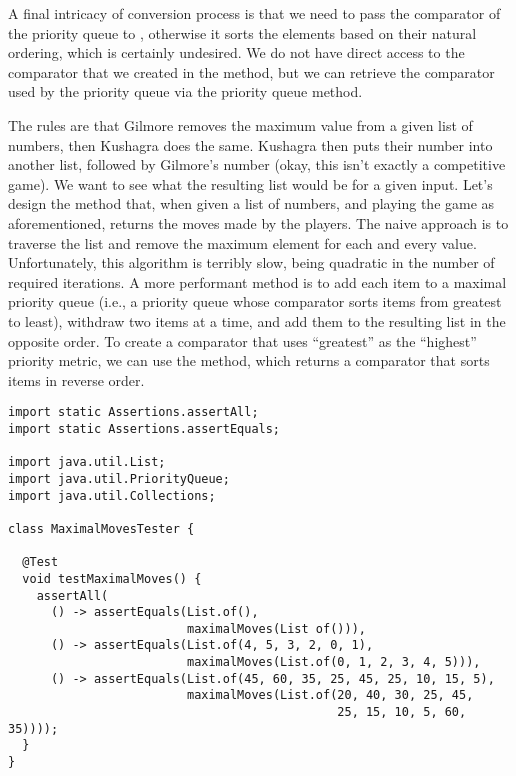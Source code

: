 A final intricacy of conversion process is that we need to pass the comparator of the priority queue to , otherwise it sorts the elements based on their natural ordering, which is certainly undesired. 
We do not have direct access to the comparator that we created in the  method, but we can retrieve the comparator used by the priority queue via the priority queue  method. 

The rules are that Gilmore removes the maximum value from a given list of numbers, then Kushagra does the same.
Kushagra then puts their number into another list, followed by Gilmore's number (okay, this isn't exactly a competitive game).
We want to see what the resulting list would be for a given input.
Let's design the  method that, when given a list of numbers, and playing the game as aforementioned, returns the moves made by the players.
The naive approach is to traverse the list and remove the maximum element for each and every value. 
Unfortunately, this algorithm is terribly slow, being quadratic in the number of required iterations.
A more performant method is to add each item to a maximal priority queue (i.e., a priority queue whose comparator sorts items from greatest to least), withdraw two items at a time, and add them to the resulting list in the opposite order.
To create a comparator that uses ``greatest'' as the ``highest'' priority metric, we can use the  method, which returns a comparator that sorts items in reverse order.

\begin{lstlisting}[language=MyJava]
import static Assertions.assertAll;
import static Assertions.assertEquals;

import java.util.List;
import java.util.PriorityQueue;
import java.util.Collections;

class MaximalMovesTester {

  @Test
  void testMaximalMoves() {
    assertAll(
      () -> assertEquals(List.of(), 
                         maximalMoves(List of())),
      () -> assertEquals(List.of(4, 5, 3, 2, 0, 1), 
                         maximalMoves(List.of(0, 1, 2, 3, 4, 5))),
      () -> assertEquals(List.of(45, 60, 35, 25, 45, 25, 10, 15, 5), 
                         maximalMoves(List.of(20, 40, 30, 25, 45, 
                                              25, 15, 10, 5, 60, 35))));
  }
}
\end{lstlisting}

